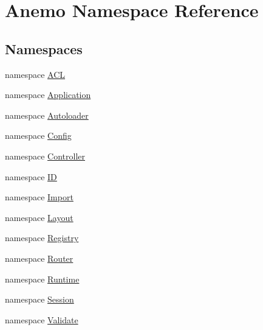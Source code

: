 \hypertarget{namespace_anemo}{
\section{Anemo Namespace Reference}
\label{namespace_anemo}
}
\subsection*{Namespaces}
\begin{DoxyCompactItemize}
\item 
namespace \hyperlink{namespace_anemo_1_1_a_c_l}{ACL}
\item 
namespace \hyperlink{namespace_anemo_1_1_application}{Application}
\item 
namespace \hyperlink{namespace_anemo_1_1_autoloader}{Autoloader}
\item 
namespace \hyperlink{namespace_anemo_1_1_config}{Config}
\item 
namespace \hyperlink{namespace_anemo_1_1_controller}{Controller}
\item 
namespace \hyperlink{namespace_anemo_1_1_i_d}{ID}
\item 
namespace \hyperlink{namespace_anemo_1_1_import}{Import}
\item 
namespace \hyperlink{namespace_anemo_1_1_layout}{Layout}
\item 
namespace \hyperlink{namespace_anemo_1_1_registry}{Registry}
\item 
namespace \hyperlink{namespace_anemo_1_1_router}{Router}
\item 
namespace \hyperlink{namespace_anemo_1_1_runtime}{Runtime}
\item 
namespace \hyperlink{namespace_anemo_1_1_session}{Session}
\item 
namespace \hyperlink{namespace_anemo_1_1_validate}{Validate}
\end{DoxyCompactItemize}
